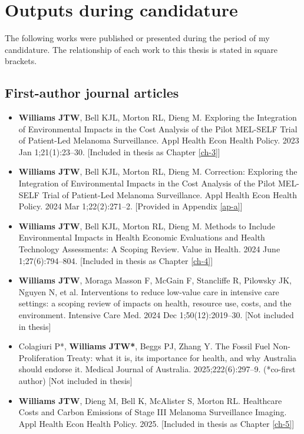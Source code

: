 \chapter{Outputs during candidature}
The following works were published or presented during the period of my candidature. The relationship of each work to this thesis is stated in square brackets. 

\section*{First-author journal articles}
\begin{itemize}
    \item \textbf{Williams JTW}, Bell KJL, Morton RL, Dieng M. Exploring the Integration of Environmental Impacts in the Cost Analysis of the Pilot MEL-SELF Trial of Patient-Led Melanoma Surveillance. Appl Health Econ Health Policy. 2023 Jan 1;21(1):23–30. [Included in thesis as Chapter \ref{ch-3}]
    \item \textbf{Williams JTW}, Bell KJL, Morton RL, Dieng M. Correction: Exploring the Integration of Environmental Impacts in the Cost Analysis of the Pilot MEL-SELF Trial of Patient-Led Melanoma Surveillance. Appl Health Econ Health Policy. 2024 Mar 1;22(2):271–2. [Provided in Appendix \ref{ap-a}]
    \item \textbf{Williams JTW}, Bell KJL, Morton RL, Dieng M. Methods to Include Environmental Impacts in Health Economic Evaluations and Health Technology Assessments: A Scoping Review. Value in Health. 2024 June 1;27(6):794–804. [Included in thesis as Chapter \ref{ch-4}]
    \item \textbf{Williams JTW}, Moraga Masson F, McGain F, Stancliffe R, Pilowsky JK, Nguyen N, et al. Interventions to reduce low-value care in intensive care settings: a scoping review of impacts on health, resource use, costs, and the environment. Intensive Care Med. 2024 Dec 1;50(12):2019–30. [Not included in thesis]
    \item Colagiuri P*, \textbf{Williams JTW*}, Beggs PJ, Zhang Y. The Fossil Fuel Non-Proliferation Treaty: what it is, its importance for health, and why Australia should endorse it. Medical Journal of Australia. 2025;222(6):297–9. (*co-first author) [Not included in thesis] 
    \item \textbf{Williams JTW}, Dieng M, Bell K, McAlister S, Morton RL. Healthcare Costs and Carbon Emissions of Stage III Melanoma Surveillance Imaging. Appl Health Econ Health Policy. 2025. [Included in thesis as Chapter \ref{ch-5}]

\end{itemize}
